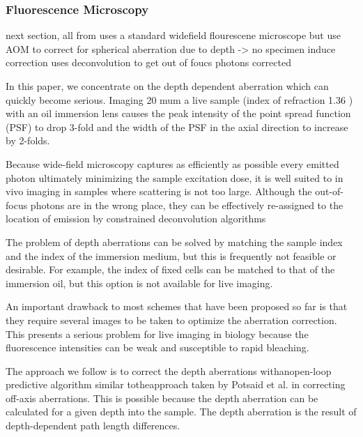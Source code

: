 
\subsubsection{Fluorescence Microscopy}
\label{sec:FlourescnecMicroscopy}

next section, all from \cite{wide_AOM_FM_spehrical_correction} uses a 
standard widefield flourescene microscope but use AOM to correct for 
spherical aberration due to depth -> no specimen induce correction
uses deconvolution to get out of foucs photons corrected

In this paper, we concentrate on the depth dependent aberration which can 
quickly become serious. Imaging 20 mum a live sample (index of refraction 1.36
) with an oil immersion lens causes the peak intensity of the point spread 
function (PSF) to drop 3-fold and the width of the PSF in the axial direction 
to increase by 2-folds. \cite{wide_AOM_FM_spehrical_correction} 

Because wide-field microscopy captures as efficiently as possible every 
emitted photon ultimately minimizing the sample excitation dose, it is well 
suited to in vivo imaging in samples where scattering is not too large. 
Although the out-of-focus photons are in the wrong place, they can be 
effectively re-assigned to the location of emission by constrained 
deconvolution algorithms \cite{wide_deconvolution}

The problem of depth aberrations can be solved by matching the sample index 
and the index of the immersion medium, but this is frequently not feasible or 
desirable. For example, the index of fixed cells can be matched to that of 
the immersion oil, but this option is not available for live imaging.

An important drawback to most schemes that have been proposed so far is that 
they require several images to be taken to optimize the aberration 
correction. This presents a serious problem for live imaging in biology 
because the fluorescence intensities can be weak and susceptible to rapid 
bleaching.

The approach we follow is to correct the depth aberrations withanopen-loop 
predictive algorithm similar totheapproach taken by Potsaid et al. in 
correcting off-axis aberrations. This is possible because the depth 
aberration can be calculated for a given depth into the sample. The depth 
aberration is the result of depth-dependent path length differences.

